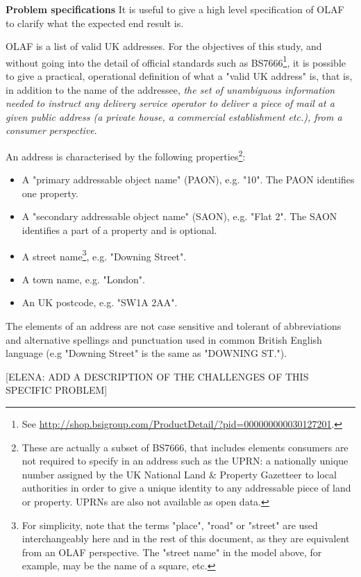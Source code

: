 \textbf{Problem specifications} It is useful to give a high level specification of OLAF to clarify what the expected end result is. 

OLAF is a list of valid UK addresses. For the objectives of this study, and without going into the detail of official standards such as BS7666\footnote{See \url{http://shop.bsigroup.com/ProductDetail/?pid=000000000030127201}.}, it is possible to give a practical, operational definition of what a "valid UK address" is, that is, in addition to the name of the addressee, {\it the set of unambiguous information needed to instruct any delivery service operator to deliver a piece of mail at a given public address (a private house, a commercial establishment etc.), from a consumer perspective}. 

An address is characterised by the following properties\footnote{These are actually a subset of BS7666, that includes elements consumers are not required to specify in an address such as the UPRN: a nationally unique number assigned by the UK National Land \& Property Gazetteer to local authorities in order to give a unique identity to any addressable piece of land or property. UPRNs are also not available as open data.}:

\begin{itemize}
    \item A "primary addressable object name" (PAON), e.g. "10". The PAON identifies one property.
    \item A "secondary addressable object name" (SAON), e.g. "Flat 2". The SAON identifies a part of a property and is optional.
    \item A street name\footnote{For simplicity, note that the terms "place", "road" or "street" are used interchangeably here and in the rest of this document, as they are equivalent from an OLAF perspective. The "street name" in the model above, for example, may be the name of a square, etc.}, e.g. "Downing Street".
    \item A town name, e.g. "London".
    \item An UK postcode, e.g. "SW1A 2AA".
\end{itemize}

The elements of an address are not case sensitive and tolerant of abbreviations and alternative spellings and punctuation used in common British English language (e.g "Downing Street" is the same as "DOWNING ST.").

[ELENA: ADD A DESCRIPTION OF THE CHALLENGES OF THIS SPECIFIC PROBLEM]

